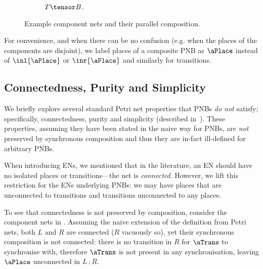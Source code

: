 \begin{figure}[ht]
\begin{subfigure}{\textwidth}
    \caption{$T \tensor B$.}
    \label{fig:composeTB}
\end{subfigure}
\hfill
\caption{Example component nets and their parallel composition.}
\label{fig:exampleTensorComposition}
\end{figure}

For convenience, and when there can be no confusion (e.g. when the places of
the components are disjoint), we label places of a composite PNB as $\aPlace$
instead of $\inl{\aPlace}$ or $\inr{\aPlace}$ and similarly for transitions.

\subsection{Connectedness, Purity and Simplicity}

We briefly explore several standard Petri net properties that PNBs \emph{do
not} satisfy; specifically, connectedness, purity and simplicity (described
in~\cite{Bernardinello1992}). These properties, assuming they have been stated
in the naive way for PNBs, are \emph{not} preserved by synchronous composition
and thus they are in-fact ill-defined for arbitrary PNBs.

When introducing ENs, we mentioned that in the literature, an EN should have no
isolated places or transitions---the net is \emph{connected}. However, we lift
this restriction for the ENs underlying PNBs: we may have places that are
unconnected to transitions and transitions unconnected to any places.

To see that connectedness is not preserved by composition, consider the
component nets in . Assuming the naive
extension of the definition from Petri nets, both $L$ and $R$ are connected
($R$ vacuously so), yet their synchronous composition is not connected: there is
no transition in $R$ for $\aTrans$ to synchronise with, therefore $\aTrans$ is
not present in any synchronisation, leaving $\aPlace$ unconnected in $L \comp
R$.

